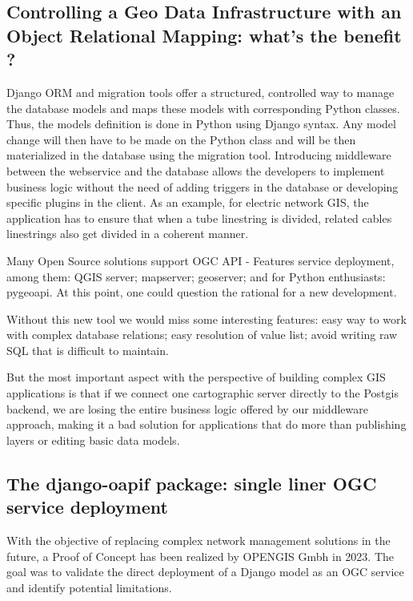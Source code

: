 \documentclass[runningheads]{llncs}
\begin{document}
\subsection{Controlling a Geo Data Infrastructure with an Object Relational Mapping: what’s the benefit ?}

 Django ORM and migration tools offer a structured, controlled way to manage the database models and maps these models with corresponding Python classes. Thus, the models definition is done in Python using Django syntax. Any model change will then have to be made on the Python class and will be then materialized in the database using the migration tool. Introducing middleware between the webservice and the database allows the developers to implement business logic without the need of adding triggers in the database or developing specific plugins in the client. As an example, for electric network GIS, the application has to ensure that when a tube linestring is divided, related cables linestrings also get divided in a coherent manner.

Many Open Source solutions support OGC API - Features service deployment, among them: QGIS server; mapserver; geoserver; and for Python enthusiasts: pygeoapi. At this point, one could question the rational for a new development. 

Without this new tool we would miss some interesting features: easy way to work with complex database relations; easy resolution of value list; avoid writing raw SQL that is difficult to maintain.

But the most important aspect with the perspective of building complex GIS applications is that if we connect one cartographic server directly to the Postgis backend, we are losing the entire business logic offered by our middleware approach, making it a bad solution for applications that do more than publishing layers or editing basic data models.
 

\subsection{The django-oapif package: single liner OGC service deployment}

With the objective of replacing complex network management solutions in the future, a Proof of Concept\cite{ref_article6}\cite{ref_article7} has been realized by OPENGIS Gmbh in 2023. The goal was to validate the direct deployment of a Django model as an OGC service and identify potential limitations.
\end{document}
